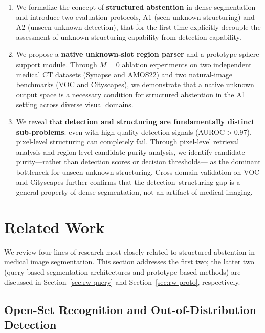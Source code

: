 \documentclass[3p,twocolumn,authoryear]{elsarticle}
\begin{document}
\begin{enumerate}
  \item We formalize the concept of \textbf{structured abstention} in dense segmentation
  and introduce two evaluation protocols, A1 (seen-unknown structuring) and A2
  (unseen-unknown detection), that for the first time explicitly decouple the assessment
  of unknown structuring capability from detection capability.

  \item We propose a \textbf{native unknown-slot region parser} and a prototype-sphere
  support module. Through $M{=}0$ ablation experiments on two independent medical CT
  datasets (Synapse and AMOS22) and two natural-image benchmarks (VOC and Cityscapes),
  we demonstrate that a native unknown output space is a necessary condition for
  structured abstention in the A1 setting across diverse visual domains.

  \item We reveal that \textbf{detection and structuring are fundamentally distinct
  sub-problems}: even with high-quality detection signals (AUROC$>$0.97),
  pixel-level structuring can completely fail.
  Through pixel-level retrieval analysis and region-level candidate purity analysis,
  we identify candidate purity---rather than detection scores or decision thresholds---
  as the dominant bottleneck for unseen-unknown structuring.
  Cross-domain validation on VOC and Cityscapes further confirms that the
  detection--structuring gap is a general property of dense segmentation, not an
  artifact of medical imaging.
\end{enumerate}


\section{Related Work}
\label{sec:related}

We review four lines of research most closely related to structured abstention
in medical image segmentation.
This section addresses the first two;
the latter two (query-based segmentation architectures and prototype-based methods)
are discussed in Section~\ref{sec:rw-query} and Section~\ref{sec:rw-proto},
respectively.

\subsection{Open-Set Recognition and Out-of-Distribution Detection}
\label{sec:rw-osr}
\end{document}
